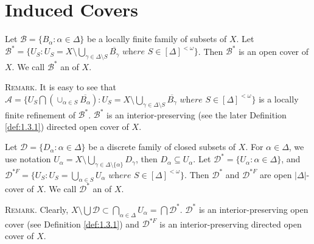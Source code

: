 \documentclass[prelim.tex]{subfiles}
\begin{document}
	\section{Induced Covers}  
    \label{sec:1.2}


{\label{def:1.2.1} 
Let $\mathscr{B}=\{B_\alpha: \alpha\in\Delta\}$ be a locally finite
family of subsets of $X$. 
Let $\mathscr{B}^* = \{U_S: 
U_S = X \setminus \bigcup_{\gamma \in\Delta\setminus S} \overline{B_\gamma}
\textit{ where } S\in [\Delta]^{<\omega}\}$. 
Then $\mathscr{B}^*$ 
is an open cover of $X$. We call $\mathscr{B}^*$ an 
of $X$.


}%
\vspace{8pt}
\noindent\textsc{Remark}. 
It is easy to see that 
$\mathscr{A} = \{U_S\bigcap (\cup_{\alpha\in S} \overline{B_\alpha}): U_S = X \setminus \bigcup_{\gamma \in\Delta\setminus S} \overline{B_\gamma}
\textit{ where } S\in [\Delta]^{<\omega}\}$ 
is a locally finite refinement of $\mathscr{B}^*$.
$\mathscr{B}^*$ is an interior-preserving 
(see the later Definition \ref{def:1.3.1}) directed open cover of $X$. 

{\label{def:1.2.2}
Let $\mathscr{D} = \{D_\alpha: \alpha \in \Delta\}$ be a discrete family of 
closed subsets of $X$.
For $\alpha\in\Delta$, we use notation 
$U_\alpha = X \setminus \bigcup_{\gamma\in\Delta\setminus\{\alpha\}}D_\gamma$,
then $D_\alpha \subseteq U_\alpha$.
Let $\mathscr{D}^* = \{ U_\alpha: \alpha\in\Delta\}$, 
and
$\mathscr{D}^{*F} = \{U_S: U_S = \bigcup_{\alpha \in S}U_\alpha
\textit{ where } S\in [\Delta]^{<\omega}\}$.
Then $\mathscr{D}^*$ and $\mathscr{D}^{*F}$ are open $|\Delta|$-cover of $X$.
We call $\mathscr{D}^*$ an  of $X$.
} %

\vspace{10pt}
\noindent\textsc{Remark}. 
Clearly, $X \setminus \bigcup\mathscr{D}\subset \bigcap_{\alpha\in\Delta}U_\alpha 
= \bigcap\mathscr{D}^*$.
$\mathscr{D}^*$ is an interior-preserving open cover (see Definition \ref{def:1.3.1}) 
and $\mathscr{D}^{*F}$ is an interior-preserving directed open cover of $X$. 
\end{document}
